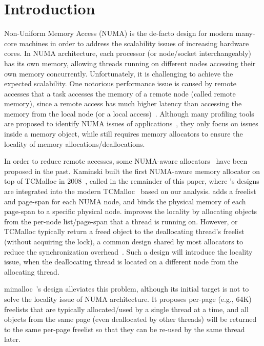 
\section{Introduction}
\label{sec:intro}


Non-Uniform Memory Access (NUMA) is the de-facto design for modern many-core machines in order to address the scalability issues of increasing hardware cores. In NUMA architecture, each processor (or node/socket interchangeably) has its own memory, allowing threads running on different nodes accessing their own memory concurrently. Unfortunately, it is challenging to achieve the expected scalability. One notorious performance issue is caused by remote accesses that a task accesses the memory of a remote node (called remote memory), since a remote access has much higher latency than accessing the memory from the local node (or a local access)~\cite{Blagodurov:2011:CNC:2002181.2002182}. Although many profiling tools are proposed to identify NUMA issues of applications~\cite{Intel:VTune, Memphis, Lachaize:2012:MMP:2342821.2342826, XuNuma, NumaMMA, 7847070, NumaPerf}, they only focus on issues inside a memory object, while still requires memory allocators to ensure the locality of memory allocations/deallocations. 

In order to reduce remote accesses, some NUMA-aware allocators~\cite{tcmallocnuma, kim2013node, yang2019jarena} have been proposed in the past. Kaminski built the first NUMA-aware memory allocator on top of TCMalloc in 2008~\cite{tcmallocnuma}, called \TN{} in the remainder of this paper, where \TN{}'s designs are integrated into the modern TCMalloc~\cite{tcmalloc2} based on our analysis. \TN{} adds a freelist and page-span for each NUMA node, and binds the physical memory of each page-span to a specific physical node. \TN{} improves the locality by allocating objects from the per-node list/page-span that a thread is running on. However, \TN{} or TCMalloc typically return a freed object to the deallocating thread's freelist (without acquiring the lock), a common design shared by most allocators to reduce the synchronization overhead~\cite{Hoard}. Such a design will introduce the locality issue, when the deallocating thread is located on a different node from the allocating thread.  

mimalloc~\cite{mimalloc}'s design alleviates this problem, although its initial target is not to solve the locality issue of NUMA architecture. It proposes per-page (e.g., 64K) freelists that are typically allocated/used by a single thread at a time, and all objects from the same page (even deallocated by other threads) will be returned to the same per-page freelist so that they can be re-used by the same thread later. 


